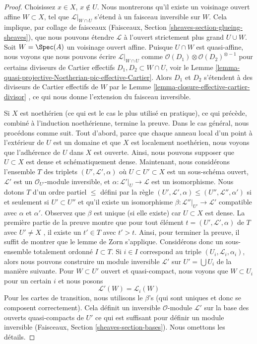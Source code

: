 \begin{proof}
Choisissez  $x \in X$,  $x \not \in U$. Nous montrerons qu'il existe un voisinage
ouvert affine  $W \subset X$, tel que  $\mathcal{L}|_{W \cap U}$  s'étend à un faisceau inversible
sur  $W$. Cela implique, par collage de faisceaux (Faisceaux, Section
 \ref{sheaves-section-glueing-sheaves}), que nous pouvons étendre  $\mathcal{L}$  à l'ouvert strictement plus
grand  $U \cup W$. Soit  $W = \Spec(A)$  un voisinage ouvert affine. Puisque
 $U \cap W$  est quasi-affine, nous voyons que nous pouvons écrire  $\mathcal{L}|_{W \cap U}$ 
comme  $\mathcal{O}(D_1) \otimes \mathcal{O}(D_2)^{\otimes -1}$  pour certains diviseurs de Cartier effectifs  $D_1, D_2 \subset W \cap U$, voir
le Lemme  \ref{lemma-quasi-projective-Noetherian-pic-effective-Cartier}. Alors  $D_1$  et  $D_2$  s'étendent à des
diviseurs de Cartier effectifs de  $W$  par le Lemme  \ref{lemma-closure-effective-cartier-divisor} , ce qui
nous donne l'extension du faisceau inversible.

\medskip\noindent
Si  $X$  est noethérien (ce qui est le cas le plus utilisé en pratique), ce
qui précède, combiné à l'induction noethérienne, termine la preuve. Dans le cas
général, nous procédons comme suit. Tout d'abord, parce que chaque anneau local
d'un point à l'extérieur de  $U$  est un domaine et que  $X$  est
localement noethérien, nous voyons que l'adhérence de  $U$  dans
 $X$  est ouverte. Ainsi, nous pouvons supposer que  $U \subset X$  est dense
et schématiquement dense. Maintenant, nous considérons l'ensemble  $T$  des
triplets  $(U', \mathcal{L}', \alpha)$  où  $U \subset U' \subset X$  est un sous-schéma ouvert,  $\mathcal{L}'$  est
un  $\mathcal{O}_{U'}$-module inversible, et  $\alpha : \mathcal{L}'|_U \to \mathcal{L}$  est un isomorphisme. Nous
dotons  $T$  d'un ordre partiel  $\leq$  défini par la règle
 $(U', \mathcal{L}', \alpha) \leq (U'', \mathcal{L}'', \alpha')$  si et seulement si  $U' \subset U''$  et qu'il existe un isomorphisme
 $\beta : \mathcal{L}''|_{U'} \to \mathcal{L}'$  compatible avec  $\alpha$  et  $\alpha'$. Observez que
 $\beta$  est unique (si elle existe) car  $U \subset X$  est dense. La première
partie de la preuve montre que pour tout élément  $t = (U', \mathcal{L}', \alpha)$  de  $T$  avec
 $U' \not = X$ , il existe un  $t' \in T$  avec  $t' > t$. Ainsi, pour terminer la
preuve, il suffit de montrer que le lemme de Zorn s'applique. Considérons donc un
sous-ensemble totalement ordonné  $I \subset T$. Si  $i \in I$  correspond au
triple  $(U_i, \mathcal{L}_i, \alpha_i)$, alors nous pouvons construire un module inversible
 $\mathcal{L}'$  sur  $U' = \bigcup U_i$  de la manière suivante. Pour  $W \subset U'$  ouvert et
quasi-compact, nous voyons que  $W \subset U_i$  pour un certain  $i$  et nous
posons
$$
\mathcal{L}'(W) = \mathcal{L}_i(W)
$$
Pour les cartes de transition, nous utilisons le  $\beta$'s (qui sont uniques
et donc se composent correctement). Cela définit un inversible
 $\mathcal{O}$-module $\mathcal{L}'$ sur la base des ouverts quasi-compacts
de $U'$ ce qui est suffisant pour définir un module inversible (Faisceaux,
Section  \ref{sheaves-section-bases}). Nous omettons les détails.
\end{proof}

